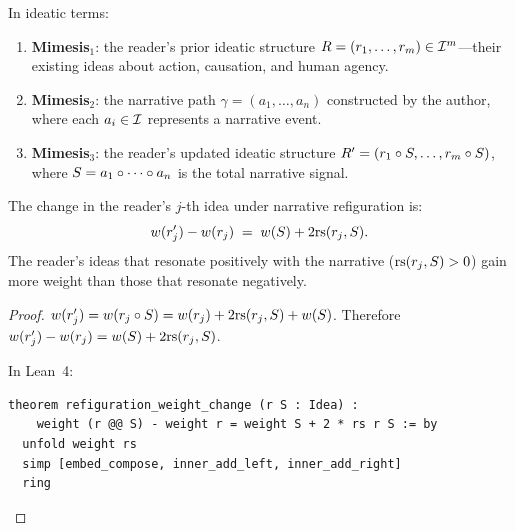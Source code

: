 \begin{definition}
\label{def:mimesis}
In ideatic terms:
\begin{enumerate}
\item \textbf{Mimesis$_1$}: the reader's prior ideatic structure
$R = (r_1, \ldots, r_m) \in \mathcal{I}^m$---their existing ideas about
action, causation, and human agency.
\item \textbf{Mimesis$_2$}: the narrative path
$\gamma = (a_1, \ldots, a_n)$ constructed by the author, where each
$a_i \in \mathcal{I}$ represents a narrative event.
\item \textbf{Mimesis$_3$}: the reader's updated ideatic structure
$R' = (r_1 \circ S, \ldots, r_m \circ S)$, where
$S = a_1 \circ \cdots \circ a_n$ is the total narrative signal.
\end{enumerate}
\end{definition}

\begin{theorem}
\label{thm:refiguration}
The change in the reader's $j$-th idea under narrative refiguration is:
\[
  w(r_j') - w(r_j)
  \;=\; w(S) + 2\mathrm{rs}(r_j, S).
\]
The reader's ideas that resonate positively with the narrative ($\mathrm{rs}(r_j, S) > 0$)
gain more weight than those that resonate negatively.
\end{theorem}

\begin{proof}
$w(r_j') = w(r_j \circ S) = w(r_j) + 2\mathrm{rs}(r_j, S) + w(S)$.
Therefore $w(r_j') - w(r_j) = w(S) + 2\mathrm{rs}(r_j, S)$.

In Lean~4:
\begin{lstlisting}
theorem refiguration_weight_change (r S : Idea) :
    weight (r @@ S) - weight r = weight S + 2 * rs r S := by
  unfold weight rs
  simp [embed_compose, inner_add_left, inner_add_right]
  ring
\end{lstlisting}
\end{proof}

